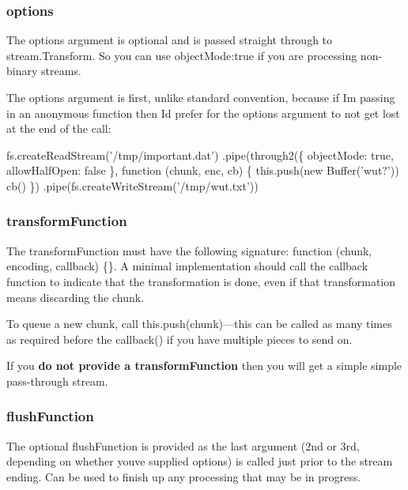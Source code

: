 \subsubsection*{options}

The options argument is optional and is passed straight through to {\ttfamily stream.\+Transform}. So you can use {\ttfamily object\+Mode\+:true} if you are processing non-\/binary streams.

The {\ttfamily options} argument is first, unlike standard convention, because if I\textquotesingle{}m passing in an anonymous function then I\textquotesingle{}d prefer for the options argument to not get lost at the end of the call\+:


\begin{DoxyCode}
fs.createReadStream('/tmp/important.dat')
    .pipe(through2(\{ objectMode: true, allowHalfOpen: false \}, function (chunk, enc, cb) \{
        this.push(new Buffer('wut?'))
    cb()
    \})
  .pipe(fs.createWriteStream('/tmp/wut.txt'))
\end{DoxyCode}


\subsubsection*{transform\+Function}

The {\ttfamily transform\+Function} must have the following signature\+: {\ttfamily function (chunk, encoding, callback) \{\}}. A minimal implementation should call the {\ttfamily callback} function to indicate that the transformation is done, even if that transformation means discarding the chunk.

To queue a new chunk, call {\ttfamily this.\+push(chunk)}---this can be called as many times as required before the {\ttfamily callback()} if you have multiple pieces to send on.

If you {\bfseries do not provide a {\ttfamily transform\+Function}} then you will get a simple simple pass-\/through stream.

\subsubsection*{flush\+Function}

The optional {\ttfamily flush\+Function} is provided as the last argument (2nd or 3rd, depending on whether you\textquotesingle{}ve supplied options) is called just prior to the stream ending. Can be used to finish up any processing that may be in progress.

